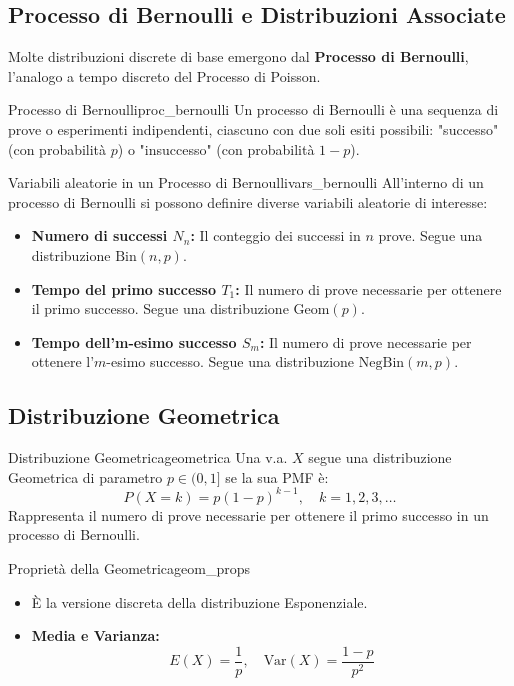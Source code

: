 \subsection{Processo di Bernoulli e Distribuzioni Associate}
Molte distribuzioni discrete di base emergono dal \textbf{Processo di Bernoulli}, l'analogo a tempo discreto del Processo di Poisson.

\begin{definizione}{Processo di Bernoulli}{proc_bernoulli}
Un processo di Bernoulli è una sequenza di prove o esperimenti indipendenti, ciascuno con due soli esiti possibili: "successo" (con probabilità \(p\)) o "insuccesso" (con probabilità \(1-p\)).
\end{definizione}

\begin{nota}{Variabili aleatorie in un Processo di Bernoulli}{vars_bernoulli}
All'interno di un processo di Bernoulli si possono definire diverse variabili aleatorie di interesse:
\begin{itemize}
    \item \textbf{Numero di successi \(N_n\):} Il conteggio dei successi in \(n\) prove. Segue una distribuzione \(\text{Bin}(n,p)\).
    \item \textbf{Tempo del primo successo \(T_1\):} Il numero di prove necessarie per ottenere il primo successo. Segue una distribuzione \(\text{Geom}(p)\).
    \item \textbf{Tempo dell'm-esimo successo \(S_m\):} Il numero di prove necessarie per ottenere l'\(m\)-esimo successo. Segue una distribuzione \(\text{NegBin}(m,p)\).
\end{itemize}
\end{nota}

\subsection{Distribuzione Geometrica}

\begin{definizione}{Distribuzione Geometrica}{geometrica}
Una v.a. \(X\) segue una distribuzione Geometrica di parametro \(p \in (0,1]\) se la sua PMF è:
\[
P(X=k) = p(1-p)^{k-1}, \quad k=1, 2, 3, \dots
\]
Rappresenta il numero di prove necessarie per ottenere il primo successo in un processo di Bernoulli.
\end{definizione}

\begin{proposizione}{Proprietà della Geometrica}{geom_props}
\begin{itemize}
    \item È la versione discreta della distribuzione Esponenziale.
    \item \textbf{Media e Varianza:}
    \[ E(X) = \frac{1}{p}, \quad \text{Var}(X) = \frac{1-p}{p^2} \]
\end{itemize}
\end{proposizione}


